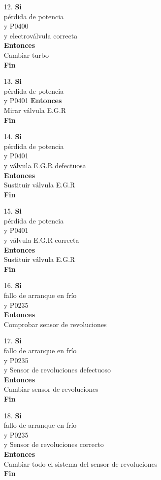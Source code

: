 \documentclass[a4paper,12pt]{article}
\newcommand\tab[1][1cm]{\hspace*{#1}}
\begin{document}
\begin{itemize}
\item[12.]\textbf{Si}\\ \tab pérdida de potencia\\ \tab y P0400\\ \tab y electroválvula correcta\\\textbf{Entonces}\\ \tab Cambiar turbo\\ \tab \textbf{Fin}
\item[13.]\textbf{Si}\\ \tab pérdida de potencia\\ \tab y P0401 \textbf{Entonces}\\ \tab Mirar válvula E.G.R\\ \tab \textbf{Fin}
\item[14.]\textbf{Si}\\ \tab pérdida de potencia\\ \tab y P0401\\ \tab y válvula E.G.R defectuosa\\  \textbf{Entonces}\\ \tab Sustituir válvula E.G.R\\ \tab \textbf{Fin}
\item[15.]\textbf{Si}\\ \tab pérdida de potencia\\ \tab y P0401\\ \tab y válvula E.G.R correcta\\  \textbf{Entonces}\\ \tab Sustituir válvula E.G.R\\ \tab \textbf{Fin}
\item[16.]\textbf{Si}\\ \tab fallo de arranque en frío\\ \tab y P0235\\ \textbf{Entonces}\\ \tab Comprobar sensor de revoluciones
\item[17.]\textbf{Si}\\ \tab fallo de arranque en frío\\ \tab y P0235\\ \tab y Sensor de revoluciones defectuoso \\ \textbf{Entonces}\\ \tab Cambiar sensor de revoluciones \\ \tab \textbf{Fin}
\item[18.]\textbf{Si}\\ \tab fallo de arranque en frío\\ \tab y P0235\\ \tab y Sensor de revoluciones correcto \\ \textbf{Entonces}\\ \tab Cambiar todo el sistema del sensor de revoluciones \\ \tab \textbf{Fin}

\end{itemize}
\end{document}
